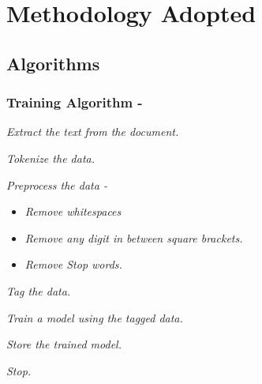 \chapter{Methodology Adopted}
\label{C3} %
\section{Algorithms}



\subsection{Training Algorithm -}
    \begin{algorithmic}[1]
        \item \textit{Extract the text from the document.}
        \item \textit{Tokenize the data.}
        \item \textit{Preprocess the data -}
        \begin{itemize}
            \item \textit{Remove whitespaces}
            \item \textit{Remove any digit in between square brackets.}
            \item \textit{Remove Stop words.}
        \end{itemize}
        \item \textit{Tag the data.}
        \item \textit{Train a model using the tagged data.}
        \item \textit{Store the trained model.}
        \item \textit{Stop.}
    \end{algorithmic}
    
